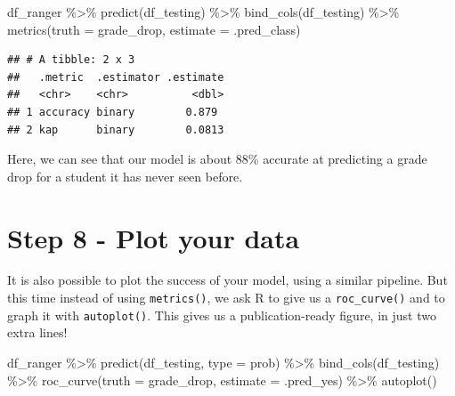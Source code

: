 \documentclass[
]{book}
\newenvironment{Shaded}{\begin{snugshade}}{\end{snugshade}}
\newcommand{\AttributeTok}[1]{\textcolor[rgb]{0.77,0.63,0.00}{#1}}
\newcommand{\FunctionTok}[1]{\textcolor[rgb]{0.00,0.00,0.00}{#1}}
\newcommand{\NormalTok}[1]{#1}
\newcommand{\SpecialCharTok}[1]{\textcolor[rgb]{0.00,0.00,0.00}{#1}}
\newcommand{\StringTok}[1]{\textcolor[rgb]{0.31,0.60,0.02}{#1}}
\begin{document}
\begin{Shaded}
\begin{Highlighting}[]
\NormalTok{df\_ranger }\SpecialCharTok{\%\textgreater{}\%}
  \FunctionTok{predict}\NormalTok{(df\_testing) }\SpecialCharTok{\%\textgreater{}\%}
  \FunctionTok{bind\_cols}\NormalTok{(df\_testing) }\SpecialCharTok{\%\textgreater{}\%} 
  \FunctionTok{metrics}\NormalTok{(}\AttributeTok{truth =}\NormalTok{ grade\_drop, }\AttributeTok{estimate =}\NormalTok{ .pred\_class)}
\end{Highlighting}
\end{Shaded}

\begin{verbatim}
## # A tibble: 2 x 3
##   .metric  .estimator .estimate
##   <chr>    <chr>          <dbl>
## 1 accuracy binary        0.879 
## 2 kap      binary        0.0813
\end{verbatim}

Here, we can see that our model is about 88\% accurate at predicting a grade drop for a student it has never seen before.

\hypertarget{step-8---plot-your-data}{%
\section{Step 8 - Plot your data}\label{step-8---plot-your-data}}

It is also possible to plot the success of your model, using a similar pipeline. But this time instead of using \texttt{metrics()}, we ask R to give us a \texttt{roc\_curve()} and to graph it with \texttt{autoplot()}. This gives us a publication-ready figure, in just two extra lines!

\begin{Shaded}
\begin{Highlighting}[]
\NormalTok{df\_ranger }\SpecialCharTok{\%\textgreater{}\%}
  \FunctionTok{predict}\NormalTok{(df\_testing, }\AttributeTok{type =} \StringTok{\textquotesingle{}prob\textquotesingle{}}\NormalTok{) }\SpecialCharTok{\%\textgreater{}\%}
  \FunctionTok{bind\_cols}\NormalTok{(df\_testing) }\SpecialCharTok{\%\textgreater{}\%} 
  \FunctionTok{roc\_curve}\NormalTok{(}\AttributeTok{truth =}\NormalTok{ grade\_drop, }\AttributeTok{estimate =}\NormalTok{ .pred\_yes) }\SpecialCharTok{\%\textgreater{}\%} 
  \FunctionTok{autoplot}\NormalTok{()}
\end{Highlighting}
\end{Shaded}
\end{document}
